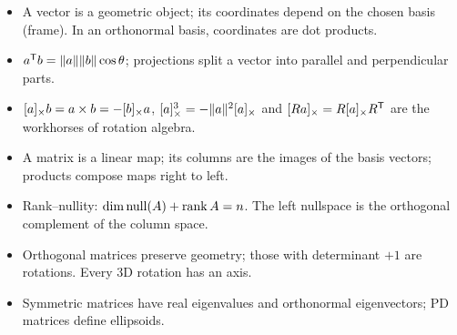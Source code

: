 \begin{takeaways}
\begin{itemize}
  \item A vector is a geometric object; its coordinates depend on the chosen basis (frame). In an orthonormal basis,
        coordinates are dot products.
  \item $a^{\mathsf{T}} b = \|a\|\|b\|\cos\theta$; projections split a vector into parallel and perpendicular parts.
  \item $[a]_{\times}b = a\times b = -[b]_{\times}a$, $[a]_{\times}^3 = -\|a\|^2[a]_{\times}$ and $[Ra]_{\times} = R[a]_{\times}R^{\mathsf{T}}$ are the workhorses of rotation algebra.
  \item A matrix is a linear map; its columns are the images of the basis vectors; products compose maps right to left.
  \item Rank--nullity: $\dim\operatorname{null}(A) + \operatorname{rank} A = n$. The left nullspace is the orthogonal complement of the column space.
  \item Orthogonal matrices preserve geometry; those with determinant $+1$ are rotations. Every 3D rotation has an axis.
  \item Symmetric matrices have real eigenvalues and orthonormal eigenvectors; PD matrices define ellipsoids.
\end{itemize}
\end{takeaways}

